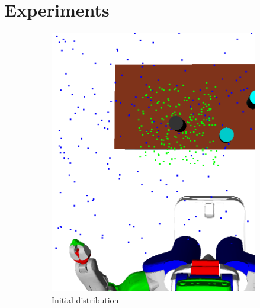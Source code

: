 \section{Experiments}
\begin{figure}[t]
  \centering
  \begin{subfigure}[b]{0.4\linewidth}
    \includegraphics[width=\textwidth]{images/learns.png}
    \caption{Initial distribution}
  \end{subfigure}
  \begin{subfigure}[b]{0.4\linewidth}

\end{subfigure}
\end{figure}
